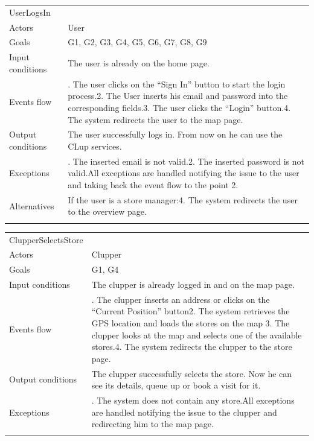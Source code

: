 \begin{longtable}[]{@{}
  >{\raggedright\arraybackslash}p{}
  >{\raggedright\arraybackslash}p{}@{}}
\toprule
UserLogsIn & \\ \addlinespace
\midrule
\endhead
Actors & User \\ \addlinespace
Goals & G1, G2, G3, G4, G5, G6, G7, G8, G9 \\ \addlinespace
Input conditions & The user is already on the home
page. \\ \addlinespace
Events flow & 1. The user clicks on the ``Sign In'' button to start the
login process.2. The User inserts his email and password into the
corresponding fields.3. The user clicks the ``Login'' button.4. The
system redirects the user to the map page. \\ \addlinespace
Output conditions & The user successfully logs in. From now on he can
use the CLup services. \\ \addlinespace
Exceptions & 1. The inserted email is not valid.2. The inserted password
is not valid.All exceptions are handled notifying the issue to the user
and taking back the event flow to the point 2. \\ \addlinespace
Alternatives & If the user is a store manager:4. The system redirects
the user to the overview page. \\ \addlinespace
\bottomrule
\end{longtable}

\begin{longtable}[]{@{}
  >{\raggedright\arraybackslash}p{}
  >{\raggedright\arraybackslash}p{}@{}}
\toprule
ClupperSelectsStore & \\ \addlinespace
\midrule
\endhead
Actors & Clupper \\ \addlinespace
Goals & G1, G4 \\ \addlinespace
Input conditions & The clupper is already logged in and on the map
page. \\ \addlinespace
Events flow & 1. The clupper inserts an address or clicks on the
``Current Position'' button2. The system retrieves the GPS location and
loads the stores on the map 3. The clupper looks at the map and selects
one of the available stores.4. The system redirects the clupper to the
store page. \\ \addlinespace
Output conditions & The clupper successfully selects the store. Now he
can see its details, queue up or book a visit for it. \\ \addlinespace
Exceptions & 1. The system does not contain any store.All exceptions are
handled notifying the issue to the clupper and redirecting him to the
map page. \\ \addlinespace
\bottomrule
\end{longtable}

